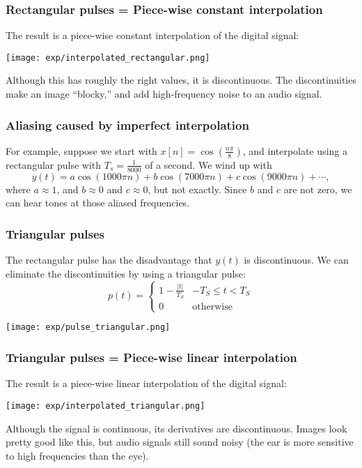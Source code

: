 \documentclass{beamer}
\begin{document}
\begin{frame}
  \frametitle{Rectangular pulses = Piece-wise constant interpolation}

  The result is a  piece-wise constant interpolation of the digital signal:

  \centerline{\texttt{[image: exp/interpolated\_rectangular.png]}}

  Although this has roughly the right values, it is discontinuous.
  The discontinuities make an image ``blocky,'' and add high-frequency
  noise to an audio signal.
\end{frame}

\begin{frame}
  \frametitle{Aliasing caused by imperfect interpolation}

  For example, suppose we start with
  $x[n]=\cos\left(\frac{n\pi}{8}\right)$, and interpolate using a
  rectangular pulse with $T_s=\frac{1}{8000}$ of a second.  We wind up
  with
  \begin{displaymath}
    y(t) = a\cos\left(1000\pi n\right)+b\cos\left(7000\pi n\right)+c\cos\left(9000\pi n\right)+\cdots,
  \end{displaymath}
  where $a\approx 1$, and $b\approx 0$ and $c\approx 0$, but not
  exactly.  Since $b$ and $c$ are not zero, we can hear tones at those
  aliased frequencies.
\end{frame}

\begin{frame}
  \frametitle{Triangular pulses}

  The rectangular pulse has the disadvantage that $y(t)$ is discontinuous.
  We can eliminate the discontinuities by using a triangular pulse:
  \begin{displaymath}
    p(t) = \begin{cases}
      1-\frac{|t|}{T_S} & -T_S\le t<T_S\\
      0 & \mbox{otherwise}
    \end{cases}
  \end{displaymath}

  \centerline{\texttt{[image: exp/pulse\_triangular.png]}}  
\end{frame}

\begin{frame}
  \frametitle{Triangular pulses = Piece-wise linear interpolation}

  The result is a  piece-wise linear interpolation of the digital signal:

  \centerline{\texttt{[image: exp/interpolated\_triangular.png]}}

  Although the signal is continuous, its derivatives are
  discontinuous.  Images look pretty good like this, but audio signals
  still sound noisy (the ear is more sensitive to high frequencies
  than the eye).
\end{frame}
\end{document}
